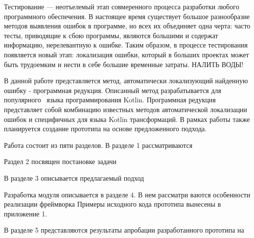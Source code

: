 \intro
Тестирование --- неотъелемый этап совмеренного процесса разработки любого программного обеспечения. В настоящее время существует большое разнообразие методов выявления ошибок в программе, но всех их объединяет одна черта: часто тесты, приводящие к сбою программы, являются большими и содержат информацию, нерелевантную к ошибке. Таким образом, в процессе тестирования появляется новый этап: локализация ошибки, который в больших проектах может быть трудоемким и нести в себе большие временные затраты. 
НАЛИТЬ ВОДЫ!

В данной работе представляется метод, автоматически локализующий найденную ошибку - программная редукция. Описанный метод разрабатывается для популярного~\cite{tiobe2018tiobe} языка программирования Kotlin. Программная редукция представляет собой комбинацию известных методов автоматической локализации ошибок и специфичных для языка Kotlin трансформаций. В рамках работы также планируется создание прототипа на основе предложенного подхода.

Работа состоит из пяти разделов. В разделе 1 рассматриваются

Раздел 2 посвящен постановке задачи 

В разделе 3 описывается предлагаемый подход


Разработка модуля описывается в разделе 4. В нем рассматри­
ваются особенности реализации фреймворка Примеры исходного кода прототипа вынесены
в приложение 1.

В разделе 5 представляются результаты апробации разработан­ного прототипа на 